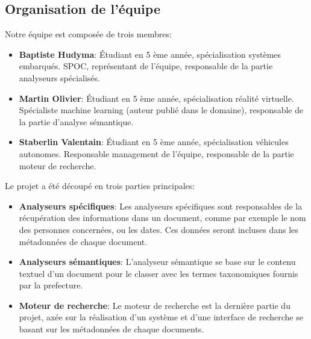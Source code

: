 \subsection{Organisation de l'équipe}

Notre équipe est composée de trois membres:
\begin{itemize}
\item \textbf{Baptiste Hudyma}:
Étudiant en 5 ème année, spécialisation systèmes embarqués.
SPOC, représentant de l'équipe, responsable de la partie analyseurs spécialisés. 

\item \textbf{Martin Olivier}: 
Étudiant en 5 ème année, spécialisation réalité virtuelle.
Spécialiste machine learning (auteur publié dans le domaine), responsable de la partie d'analyse sémantique.

\item \textbf{Staberlin Valentain}:
Étudiant en 5 ème année, spécialisation véhicules autonomes.
Responsable management de l'équipe, responsable de la partie moteur de recherche.

\end{itemize}


Le projet a été découpé en trois parties principales:
\begin{itemize}
\item \textbf{Analyseurs spécifiques}: 
Les analyseurs spécifiques sont responsables de la récupération des informations dans un document, comme par exemple le nom des personnes concernées, ou les dates.
Ces données seront incluses dans les métadonnées de chaque document.

\item \textbf{Analyseurs sémantiques}:
L'analyseur sémantique se base sur le contenu textuel d'un document pour le classer avec les termes taxonomiques fournis par la prefecture.

\item \textbf{Moteur de recherche}:
Le moteur de recherche est la dernière partie du projet, axée sur la réalisation d'un système et d'une interface de recherche se basant sur les métadonnées de chaque documents.

\end{itemize}
